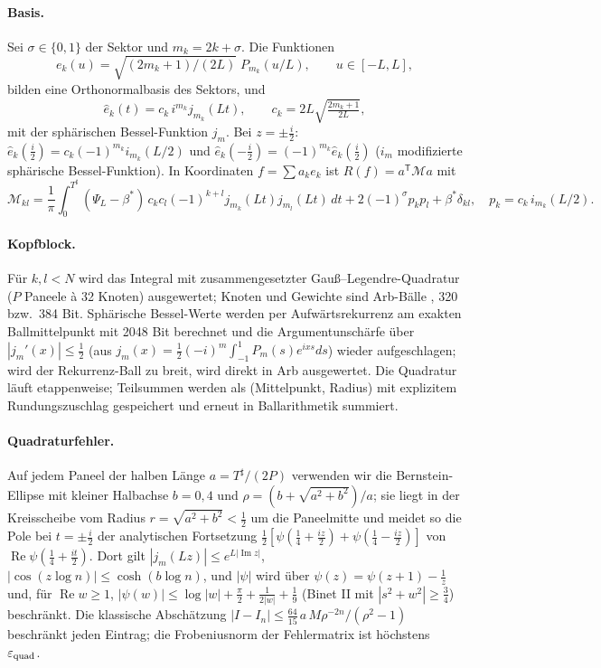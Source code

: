 \documentclass[11pt,a4paper]{article}
\theoremstyle{definition}
\renewcommand{\Re}{\operatorname{Re}}
\renewcommand{\Im}{\operatorname{Im}}
\newcommand{\eps}{\varepsilon}
\begin{document}
\paragraph{Basis.} Sei $\sigma\in\{0,1\}$ der Sektor und $m_k=2k+\sigma$. Die Funktionen
\[e_k(u)=\sqrt{(2m_k+1)/(2L)}\;P_{m_k}(u/L),\qquad u\in[-L,L],\]
bilden eine Orthonormalbasis des Sektors, und
\[
\hat e_k(t)=c_k\, i^{m_k} j_{m_k}(Lt),\qquad c_k=2L\sqrt{\tfrac{2m_k+1}{2L}},
\]
mit der sphärischen Bessel-Funktion $j_m$. Bei $z=\pm\frac i2$: $\hat e_k(\tfrac i2)=c_k(-1)^{m_k} i_{m_k}(L/2)$ und $\hat e_k(-\tfrac i2)=(-1)^{m_k}\hat e_k(\tfrac i2)$ ($i_m$ modifizierte sphärische Bessel-Funktion). In Koordinaten $f=\sum a_ke_k$ ist $R(f)=a^{\mathsf T}\mathcal M a$ mit
\[
\mathcal M_{kl}=\frac1\pi\int_0^{T^\sharp}(\Psi_L-\beta^*)\,c_kc_l(-1)^{k+l}j_{m_k}(Lt)j_{m_l}(Lt)\,dt+2(-1)^\sigma p_kp_l+\beta^*\delta_{kl},\quad p_k=c_k\,i_{m_k}(L/2).
\]

\paragraph{Kopfblock.} Für $k,l<N$ wird das Integral mit zusammengesetzter Gauß--Legendre-Quadratur ($P$ Paneele à 32 Knoten) ausgewertet; Knoten und Gewichte sind Arb-Bälle \cite{Johansson17}, 320 bzw.\ 384 Bit. Sphärische Bessel-Werte werden per Aufwärtsrekurrenz am exakten Ballmittelpunkt mit 2048 Bit berechnet und die Argumentunschärfe über $|j_m'(x)|\le\frac12$ (aus $j_m(x)=\frac12(-i)^m\int_{-1}^1P_m(s)e^{ixs}ds$) wieder aufgeschlagen; wird der Rekurrenz-Ball zu breit, wird direkt in Arb ausgewertet. Die Quadratur läuft etappenweise; Teilsummen werden als (Mittelpunkt, Radius) mit explizitem Rundungszuschlag gespeichert und erneut in Ballarithmetik summiert.

\paragraph{Quadraturfehler.} Auf jedem Paneel der halben Länge $a=T^\sharp/(2P)$ verwenden wir die Bernstein-Ellipse mit kleiner Halbachse $b=0{,}4$ und $\rho=(b+\sqrt{a^2+b^2})/a$; sie liegt in der Kreisscheibe vom Radius $r=\sqrt{a^2+b^2}<\frac12$ um die Paneelmitte und meidet so die Pole bei $t=\pm\frac i2$ der analytischen Fortsetzung $\frac12[\psi(\frac14+\frac{iz}2)+\psi(\frac14-\frac{iz}2)]$ von $\Re\psi(\frac14+\frac{it}2)$. Dort gilt $|j_m(Lz)|\le e^{L|\Im z|}$, $|\cos(z\log n)|\le\cosh(b\log n)$, und $|\psi|$ wird über $\psi(z)=\psi(z+1)-\frac1z$ und, für $\Re w\ge1$, $|\psi(w)|\le\log|w|+\frac\pi2+\frac1{2|w|}+\frac19$ (Binet II mit $|s^2+w^2|\ge\frac34$) beschränkt. Die klassische Abschätzung $|I-I_n|\le\frac{64}{15}\,a\,M\rho^{-2n}/(\rho^2-1)$ \cite{Trefethen13} beschränkt jeden Eintrag; die Frobeniusnorm der Fehlermatrix ist höchstens $\eps_{\rm quad}$.
\end{document}
